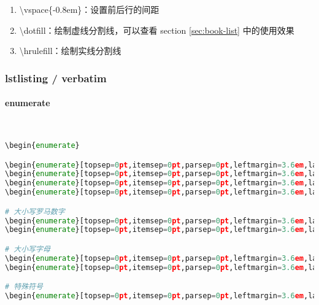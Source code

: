 \begin{enumerate}[topsep=0pt,itemsep=0pt,parsep=0pt,leftmargin=3.6em,label=\arabic*>]
        $\Rightarrow$ %
        \url{https://xxxx} \par
        eg. \verb=\textsl{\url{/https://xxxx}}=
        $\Rightarrow$ %
        \textsl{\url{https://xxxx}} \par
        eg. \verb=\emph{\url{/https://xxxx}}=
        $\Rightarrow$ %
        \emph{\url{https://xxxx}} | \textcolor{teal}{在 Calibri 字体下会比较好看}
    \item \textbackslash vspace\{-0.8em\}：设置前后行的间距
    \item \textbackslash dotfill：绘制虚线分割线，可以查看 section \ref{sec:book-list} 中的使用效果
    \item \textbackslash hrulefill：绘制实线分割线
\end{enumerate}

\subsubsection{lstlisting / verbatim}

\paragraph{enumerate}~{}

\begin{lstlisting}[language={python}]
\begin{enumerate}

\begin{enumerate}[topsep=0pt,itemsep=0pt,parsep=0pt,leftmargin=3.6em,label=\arabic*>]
\begin{enumerate}[topsep=0pt,itemsep=0pt,parsep=0pt,leftmargin=3.6em,label=\arabic*.]
\begin{enumerate}[topsep=0pt,itemsep=0pt,parsep=0pt,leftmargin=3.6em,label=\arabic*)]
\begin{enumerate}[topsep=0pt,itemsep=0pt,parsep=0pt,leftmargin=3.6em,label=(\arabic*)]

# 大小写罗马数字
\begin{enumerate}[topsep=0pt,itemsep=0pt,parsep=0pt,leftmargin=3.6em,label=\roman*>]
\begin{enumerate}[topsep=0pt,itemsep=0pt,parsep=0pt,leftmargin=3.6em,label=\Roman*>]

# 大小写字母
\begin{enumerate}[topsep=0pt,itemsep=0pt,parsep=0pt,leftmargin=3.6em,label=\alph*>]
\begin{enumerate}[topsep=0pt,itemsep=0pt,parsep=0pt,leftmargin=3.6em,label=\Alph*>]

# 特殊符号
\begin{enumerate}[topsep=0pt,itemsep=0pt,parsep=0pt,leftmargin=3.6em,label=\fnsymbol*>]
\end{lstlisting}

